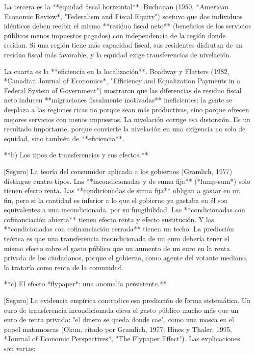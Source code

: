 \documentclass[10pt,a4paper]{article}
\begin{document}
La tercera es la **equidad fiscal horizontal**. Buchanan (1950, *American Economic Review*, "Federalism and Fiscal Equity") sostuvo que dos individuos idénticos deben recibir el mismo **residuo fiscal neto** (beneficios de los servicios públicos menos impuestos pagados) con independencia de la región donde residan. Si una región tiene más capacidad fiscal, sus residentes disfrutan de un residuo fiscal más favorable, y la equidad exige transferencias de nivelación.

La cuarta es la **eficiencia en la localización**. Boadway y Flatters (1982, *Canadian Journal of Economics*, "Efficiency and Equalization Payments in a Federal System of Government") mostraron que las diferencias de residuo fiscal neto inducen **migraciones fiscalmente motivadas** ineficientes: la gente se desplaza a las regiones ricas no porque sean más productivas, sino porque ofrecen mejores servicios con menos impuestos. La nivelación corrige esa distorsión. Es un resultado importante, porque convierte la nivelación en una exigencia no solo de equidad, sino también de **eficiencia**.

**b) Los tipos de transferencias y sus efectos.**

[Seguro] La teoría del consumidor aplicada a los gobiernos (Gramlich, 1977) distingue cuatro tipos. Las **incondicionadas y de suma fija** (*lump-sum*) solo tienen efecto renta. Las **condicionadas de suma fija** obligan a gastar en un fin, pero si la cantidad es inferior a lo que el gobierno ya gastaba en él son equivalentes a una incondicionada, por su fungibilidad. Las **condicionadas con cofinanciación abierta** tienen efecto renta y efecto sustitución. Y las **condicionadas con cofinanciación cerrada** tienen un techo. La predicción teórica es que una transferencia incondicionada de un euro debería tener el mismo efecto sobre el gasto público que un aumento de un euro en la renta privada de los ciudadanos, porque el gobierno, como agente del votante mediano, la trataría como renta de la comunidad.

**c) El efecto *flypaper*: una anomalía persistente.**

[Seguro] La evidencia empírica contradice esa predicción de forma sistemática. Un euro de transferencia incondicionada eleva el gasto público mucho más que un euro de renta privada: "el dinero se queda donde cae", como una mosca en el papel matamoscas (Okun, citado por Gramlich, 1977; Hines y Thaler, 1995, *Journal of Economic Perspectives*, "The Flypaper Effect"). Las explicaciones son varias:
\end{document}
